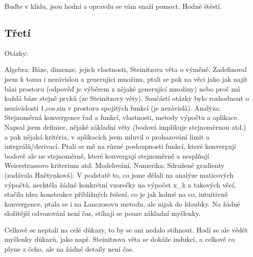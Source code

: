 \documentclass[12pt,a4paper]{article}
\begin{document}
Buďte v klidu, jsou hodní a opravdu se vám snaží pomoct. Hodně štěstí.

\subsection*{Třetí}
Otázky:

Algebra: Báze, dimenze, jejich vlastnosti, Steinitzova věta o výměně.
Zadefinoval jsem k tomu i nezávislou a generující množinu, ptali se pak na věci jako jak najít bázi prostoru (odpověď je výběrem z nějaké generující množiny) nebo proč má každá báze stejně prvků (ze Steinitzovy věty). Součástí otázky bylo rozhodnout o nezávislosti {1,cos,sin} v prostoru spojitých funkcí (je nezávislá).
Analýza: Stejnoměrná konvergence řad a funkcí, vlastnosti, metody výpočtu a aplikace. Napsal jsem definice, nějaké základní věty (bodová implikuje stejnoměrnou atd.) a pak nějaká kritéria, v aplikacích jsem mluvil o prohazování limit a integrálů/derivací. Ptali se mě na různé posloupnosti funkcí, které konvergují bodově ale ne stejnoměrně, které konvergují stejnoměrně a nesplňují Weierstrassovo kriterium atd.
Modelování, Numerika: Sdružené gradienty (zadávala Hnětynková). V podstatě to, co jsme dělali na analýze maticových výpočtů, nechtěla žádné konkrétní vzorečky na výpočet x\_k a takových věcí, stačila idea konstrukce přibližných řešení, co je jak kolmé na co, intuitivně konvergence, ptala se i na Lanczosovu metodu, ale nijak do hloubky. Na žádné složitější odvozování není čas, stíhají se pouze základní myšlenky.

Celkově se neptali na celé důkazy, to by se ani nedalo stihnout. Hodí se ale vědět myšlenky důkazů, jako např. Steinitzova věta se dokáže indukcí, a celkově co plyne z čeho, ale na žádné detaily není čas.
\end{document}
